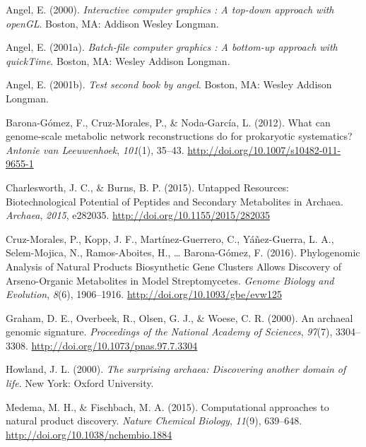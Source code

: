\documentclass[12pt,twoside]{reedthesis}
\begin{document}
  \noindent
  
  \setlength{\parindent}{-0.20in} \setlength{\leftskip}{0.20in}
  \setlength{\parskip}{8pt}
  
  \hypertarget{refs}{}
  \hypertarget{ref-angel2000}{}
  Angel, E. (2000). \emph{Interactive computer graphics : A top-down
  approach with openGL}. Boston, MA: Addison Wesley Longman.
  
  \hypertarget{ref-angel2001}{}
  Angel, E. (2001a). \emph{Batch-file computer graphics : A bottom-up
  approach with quickTime}. Boston, MA: Wesley Addison Longman.
  
  \hypertarget{ref-angel2002a}{}
  Angel, E. (2001b). \emph{Test second book by angel}. Boston, MA: Wesley
  Addison Longman.
  
  \hypertarget{ref-barona-gomezux5fwhatux5f2012}{}
  Barona-Gómez, F., Cruz-Morales, P., \& Noda-García, L. (2012). What can
  genome-scale metabolic network reconstructions do for prokaryotic
  systematics? \emph{Antonie van Leeuwenhoek}, \emph{101}(1), 35--43.
  \url{http://doi.org/10.1007/s10482-011-9655-1}
  
  \hypertarget{ref-charlesworthux5funtappedux5f2015}{}
  Charlesworth, J. C., \& Burns, B. P. (2015). Untapped Resources:
  Biotechnological Potential of Peptides and Secondary Metabolites in
  Archaea. \emph{Archaea}, \emph{2015}, e282035.
  \url{http://doi.org/10.1155/2015/282035}
  
  \hypertarget{ref-cruz-moralesux5fphylogenomicux5f2016}{}
  Cruz-Morales, P., Kopp, J. F., Martínez-Guerrero, C., Yáñez-Guerra, L.
  A., Selem-Mojica, N., Ramos-Aboites, H., \ldots{} Barona-Gómez, F.
  (2016). Phylogenomic Analysis of Natural Products Biosynthetic Gene
  Clusters Allows Discovery of Arseno-Organic Metabolites in Model
  Streptomycetes. \emph{Genome Biology and Evolution}, \emph{8}(6),
  1906--1916. \url{http://doi.org/10.1093/gbe/evw125}
  
  \hypertarget{ref-grahamux5farchaealux5f2000}{}
  Graham, D. E., Overbeek, R., Olsen, G. J., \& Woese, C. R. (2000). An
  archaeal genomic signature. \emph{Proceedings of the National Academy of
  Sciences}, \emph{97}(7), 3304--3308.
  \url{http://doi.org/10.1073/pnas.97.7.3304}
  
  \hypertarget{ref-howlandux5fsurprisingux5f2000}{}
  Howland, J. L. (2000). \emph{The surprising archaea: Discovering another
  domain of life}. New York: Oxford University.
  
  \hypertarget{ref-medemaux5fcomputationalux5f2015}{}
  Medema, M. H., \& Fischbach, M. A. (2015). Computational approaches to
  natural product discovery. \emph{Nature Chemical Biology}, \emph{11}(9),
  639--648. \url{http://doi.org/10.1038/nchembio.1884}
  
\end{document}
